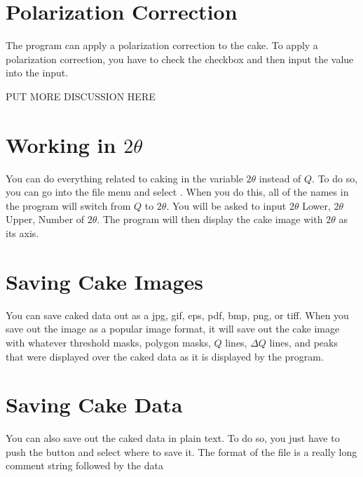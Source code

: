 \section{Polarization Correction}
The program can apply a polarization correction to the
cake. To apply a polarization correction, you have
to check the  checkbox
and then input the value into the  input.

PUT MORE DISCUSSION HERE

\section{\texorpdfstring{Working in $2\theta$}{Working in 2theta}}

You can do everything related to caking in the variable
$2\theta$ instead of $Q$. To do so, you can go into
the file menu and select . When you 
do this, all of the names in the program will switch 
from $Q$ to $2\theta$. You will be asked to input 
$2\theta$ Lower, $2\theta$ Upper, Number of $2\theta$. 
The program will then display the cake image with
$2\theta$ as its axis.

\section{Saving Cake Images}

You can save caked
data out as a jpg, gif, eps, pdf, bmp, png, or tiff.
When you save out the image as a popular image format, it
will save out the cake image with whatever threshold masks,
polygon masks, $Q$ lines, $\Delta Q$ lines, and peaks that
were displayed over the caked data as it is displayed by
the program.

\section{Saving Cake Data}

You can also save out the caked data in plain text. To do so,
you just have to push the  button and
select where to save it. The format of the file is a really
long comment string followed by the data 

